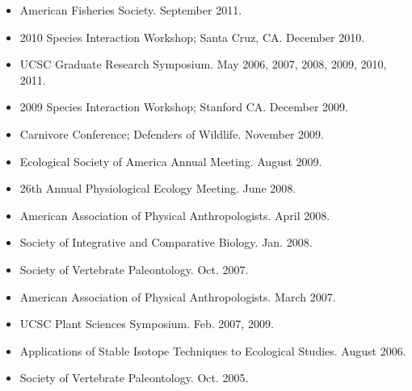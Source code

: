 \documentclass[margin,line,12pt]{res}
\begin{document}
\begin{resume}
\begin{itemize}
\item American Fisheries Society. September 2011.

\item 2010 Species Interaction Workshop; Santa Cruz, CA. December 2010.

\item UCSC Graduate Research Symposium. May 2006, 2007, 2008, 2009, 2010, 2011.

\item 2009 Species Interaction Workshop; Stanford CA. December 2009.

\item Carnivore Conference; Defenders of Wildlife. November 2009.

\item Ecological Society of America Annual Meeting. August 2009.

\item 26th Annual Physiological Ecology Meeting. June 2008.

\item American Association of Physical Anthropologists. April 2008.

\item Society of Integrative and Comparative Biology. Jan. 2008.

\item Society of Vertebrate Paleontology. Oct. 2007.

\item American Association of Physical Anthropologists. March 2007.

\item UCSC Plant Sciences Symposium. Feb. 2007, 2009.

\item Applications of Stable Isotope Techniques to Ecological Studies. August 2006.

\item Society of Vertebrate Paleontology. Oct. 2005.

\end{itemize}


\end{resume}
\end{document}
